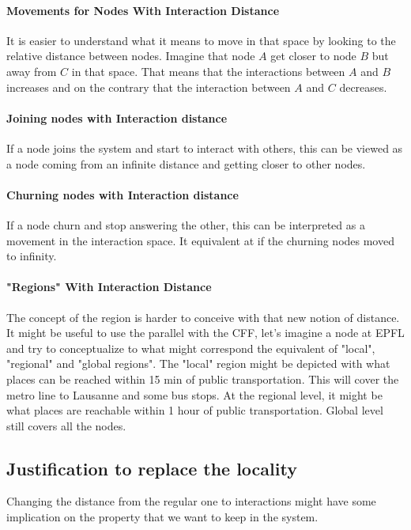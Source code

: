 \documentclass[a4paper,11pt,oneside]{report}
\begin{document}
\paragraph{Movements for Nodes With Interaction Distance}
It is easier to understand what it means to move in that space by looking to
the relative distance between nodes. Imagine that node $A$ get closer to node
$B$ but away from $C$ in that space. That means that the interactions between
$A$ and $B$ increases and on the contrary that the interaction between $A$ and
$C$ decreases.

\paragraph{Joining nodes with Interaction distance}
If a node joins the system and start to interact with others, this can be
viewed as a node coming from an infinite distance and getting closer to other
nodes.

\paragraph{Churning nodes with Interaction distance}
If a node churn and stop answering the other, this can be interpreted as a
movement in the interaction space. It equivalent at if the churning nodes moved
to infinity.  

\paragraph{"Regions" With Interaction Distance} \label{par:section-example}
The concept of the region is harder to conceive with that new notion of
distance. It might be useful to use the parallel with the CFF, let's imagine a
node at EPFL and try to conceptualize to what might correspond the equivalent
of "local", "regional" and "global regions". The "local" region might be
depicted with what places can be reached within 15 min of public
transportation. This will cover the metro line to Lausanne and some bus stops.
At the regional level, it might be what places are reachable within 1 hour of
public transportation. Global level still covers all the nodes.

\subsection{Justification to replace the locality}
Changing the distance from the regular one to interactions might have some
implication on the property that we want to keep in the system. 
\end{document}
